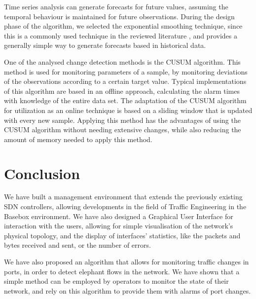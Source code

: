 \documentclass[a4paper]{IEEEtran}
\begin{document}
\par Time series analysis can generate forecasts for future values, assuming the temporal behaviour is maintained for future observations. During the design phase 
of the algorithm, we selected the exponential smoothing technique, since this is a commonly used technique in the reviewed literature \cite{jasek_usage_2013, 
munz_traffic_2010}, and provides a generally simple way to generate forecasts based in historical data.

\par One of the analysed change detection methods is the CUSUM algorithm. This method is used for monitoring parameters of a sample, by monitoring deviations of the
observations according to a certain target value. Typical implementations of this algorithm are based in an offline approach, calculating the alarm times
with knowledge of the entire data set. The adaptation of the CUSUM algorithm for utilization as an online technique is based on a sliding window that
is updated with every new sample. Applying this method has the advantages of using the CUSUM algorithm without needing extensive changes, while also reducing the 
amount of memory needed to apply this method.

\section{Conclusion}
\par We have built a management environment that extends the previously existing SDN controllers, allowing developments in the field of Traffic Engineering in the 
Basebox environment. We have also designed a Graphical User Interface for interaction with the users, allowing for simple visualisation of the network’s physical 
topology, and the display of interfaces’ statistics, like the packets and bytes received and sent, or the number of errors.

\par We have also proposed an algorithm that allows for monitoring traffic changes in ports, in order to detect elephant flows in the network. We have shown that a 
simple method can be employed by operators to monitor the state of their network, and rely on this algorithm to provide them with alarms of port changes.



%
\end{document}
